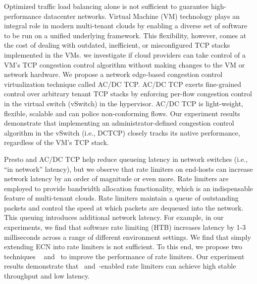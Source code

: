 Optimized traffic load balancing alone is not sufficient to 
guarantee high-performance datacenter networks. 
Virtual Machine (VM) technology plays an integral role in
modern multi-tenant clouds by enabling a diverse set of software to be run
on a unified underlying framework. This flexibility, however,
comes at the cost of dealing with outdated, inefficient,
or misconfigured TCP stacks implemented in the VMs. we
 investigate if cloud providers can take control of a VM's
TCP congestion control algorithm without making changes
to the VM or network hardware. We propose a network edge-based 
 congestion control virtualization technique called AC/DC TCP.
AC/DC TCP exerts fine-grained control over arbitrary tenant
TCP stacks by enforcing per-flow congestion control in
the virtual switch (vSwitch) in the hypervisor. AC/DC TCP is light-weight,
flexible, scalable and can police non-conforming flows. Our experiment results demonstrate that 
implementing an administrator-defined congestion control algorithm in the
vSwitch (i.e., DCTCP) closely tracks its native performance,
regardless of the VM's TCP stack.

Presto and AC/DC TCP help reduce queueing latency in 
network switches (i.e., ``in network'' latency), but we observe that 
rate limiters on end-hosts can increase network latency by an order of magnitude or even more. 
Rate limiters are employed to provide bandwidth allocation functionality, 
which is an indispensable feature of multi-tenant clouds. Rate limiters
maintain a queue of outstanding packets and control the speed at which
packets are dequeued into the network. This queuing introduces
additional network latency. For example, in our experiments, we find
that software rate limiting (HTB) increases latency by 1-3 milliseconds
across a range of different environment settings. 
We find that simply extending ECN into rate limiters is not sufficient. 
To this end, we propose two techniques \textemdash\xspace~\dem{} and~\spring{} to 
improve the performance of rate limiters.
Our experiment results demonstrate that~\dem{} and~\spring{}-enabled
rate limiters can achieve high stable throughput and low latency.





